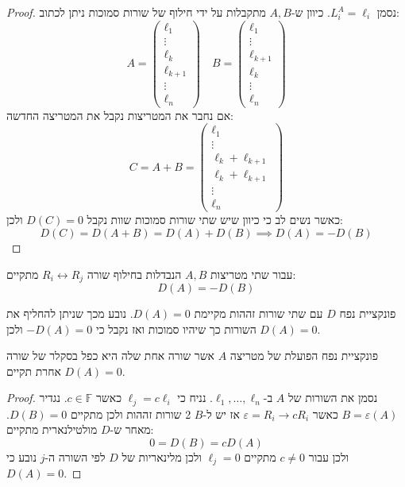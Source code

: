 \documentclass{tstextbook}
\begin{document}
\begin{proof}
נסמן \(L_{i}^{A}=\ell_{i}\). כיוון ש-\(A,B\) מתקבלות על ידי חילוף של שורות סמוכות ניתן לכתוב:
$$A=\begin{pmatrix}\ell_{1} \\\vdots \\ \ell_{k}\\ \ell_{k+1}\\ \vdots \\ \ell_{n}\end{pmatrix}\quad B=\begin{pmatrix}\ell_{1} \\\vdots \\ \ell_{k+1}\\ \ell_{k}\\ \vdots \\ \ell_{n}
\end{pmatrix}$$
אם נחבר את המטריצות נקבל את המטריצה החדשה:
$$C=A+B=\begin{pmatrix}\ell_{1} \\ \vdots \\ \ell_{k}+\ell_{k+1} \\\ell_{k}+\ell_{k+1}\\ \vdots \\ \ell_{n}
\end{pmatrix}$$
כאשר נשים לב כי כיוון שיש שתי שורות סמוכות שוות נקבל \(D(C)=0\) ולכן:
$$D(C)=D(A+B)=D(A)+D(B)\implies D(A)=-D(B)$$

\end{proof}
\begin{corollary}
עבור שתי מטריצות \(A,B\) הנבדלות בחילוף שורה \(R_{i}\leftrightarrow R_{j}\) מתקיים:
$$D(A)=-D(B)$$

\end{corollary}
\begin{corollary}
פונקציית נפח \(D\) עם שתי שורות זההות מקיימת \(D(A)=0\). נובע מכך שניתן להחליף את השורות כך שיהיו סמוכות ואז נקבל כי \(-D(A)=0\) ולכן \(D(A)=0\).

\end{corollary}
\begin{proposition}
פונקציית נפח הפועלת של מטריצה \(A\) אשר שורה אחת שלה היא כפל בסקלר של שורה אחרת תקיים \(D(A)=0\).

\end{proposition}
\begin{proof}
נסמן את השורות של \(A\) ב-\(\ell_{1},\dots,\ell_{n}\). נניח כי \(\ell_{j}=c\ell_{i}\) כאשר \(c \in \mathbb{F}\). נגדיר \(B=\varepsilon(A)\) כאשר \(\varepsilon=R_{i}\to cR_{i}\) אז יש ל-\(B\) 2 שורות זההות ולכן מתקיים \(D(B)=0\). מאחר ש-\(D\) מולטילנארית מתקיים:
$$0=D(B)=cD(A)$$
ולכן עבור \(c\neq 0\) מתקיים \(\ell_{j}=0\) ולכן מלינאריות של \(D\) לפי השורה ה-\(j\) נובע כי \(D(A)=0\).

\end{proof}
\end{document}
